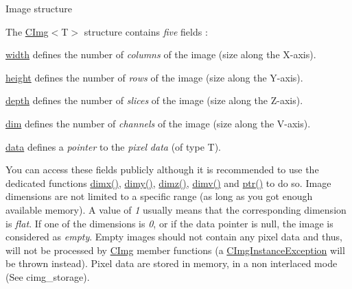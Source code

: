 \begin{DoxyParagraph}{Image structure}

\end{DoxyParagraph}
The \hyperlink{structcimg__library_1_1_c_img}{C\-Img}$<${\ttfamily T$>$} structure contains {\itshape five} fields \-:
\begin{DoxyItemize}
\item \hyperlink{structcimg__library_1_1_c_img_a5fb74a7776210bb99fd6755319ade13f}{width} defines the number of {\itshape columns} of the image (size along the X-\/axis).
\item \hyperlink{structcimg__library_1_1_c_img_a30d575fd18ae525e507315de71b4806a}{height} defines the number of {\itshape rows} of the image (size along the Y-\/axis).
\item \hyperlink{structcimg__library_1_1_c_img_a982d5d1e153477adf7f851106fe8ee3a}{depth} defines the number of {\itshape slices} of the image (size along the Z-\/axis).
\item \hyperlink{structcimg__library_1_1_c_img_ac9648dfe0a26d58e6e0030a3dbca234e}{dim} defines the number of {\itshape channels} of the image (size along the V-\/axis).
\item \hyperlink{structcimg__library_1_1_c_img_a54f252b86f19b2217aef3ec9e1e2e013}{data} defines a {\itshape pointer} to the {\itshape pixel} {\itshape data} (of type {\ttfamily T}).
\end{DoxyItemize}

You can access these fields publicly although it is recommended to use the dedicated functions \hyperlink{structcimg__library_1_1_c_img_abf1a3c383880a20428b2ea9d22f3c06e}{dimx()}, \hyperlink{structcimg__library_1_1_c_img_aa1e128f9d950b39ed312eb368741970c}{dimy()}, \hyperlink{structcimg__library_1_1_c_img_aba56e96a615d71ed9a71009768fc4b75}{dimz()}, \hyperlink{structcimg__library_1_1_c_img_ad30f8300f32a94a80e1e06c84a45de49}{dimv()} and \hyperlink{structcimg__library_1_1_c_img_af19c37d44b9fce37ad7c4a9ad247d1a0}{ptr()} to do so. Image dimensions are not limited to a specific range (as long as you got enough available memory). A value of {\itshape 1} usually means that the corresponding dimension is {\itshape flat}. If one of the dimensions is {\itshape 0}, or if the data pointer is null, the image is considered as {\itshape empty}. Empty images should not contain any pixel data and thus, will not be processed by \hyperlink{structcimg__library_1_1_c_img}{C\-Img} member functions (a \hyperlink{structcimg__library_1_1_c_img_instance_exception}{C\-Img\-Instance\-Exception} will be thrown instead). Pixel data are stored in memory, in a non interlaced mode (See cimg\-\_\-storage).


